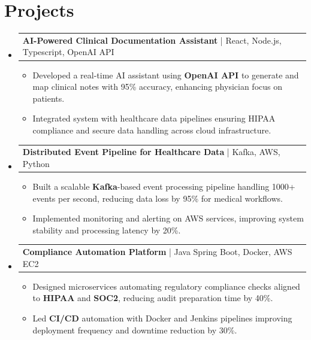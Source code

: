 \documentclass[letterpaper,11pt]{article}
\makeatletter
\newcommand{\resumeItem}[1]{
  \item\footnotesize{
    {#1 \vspace{-2pt}}
  }
}
\newcommand{\resumeProjectHeading}[2]{
    \item
    \begin{tabular*}{1.001\textwidth}{l@{\extracolsep{\fill}}r}
      \small#1 & \textbf{\small #2}\\
    \end{tabular*}\vspace{-7pt}
}
\newcommand{\resumeSubHeadingListStart}{\begin{itemize}[leftmargin=0pt, label={}]}
\newcommand{\resumeSubHeadingListEnd}{\end{itemize}}
\newcommand{\resumeItemListStart}{\begin{itemize}[leftmargin=*]}
\newcommand{\resumeItemListEnd}{\end{itemize}\vspace{-5pt}}
\makeatother
\begin{document}
\section{Projects}
    \vspace{-5pt}
    \resumeSubHeadingListStart
          \resumeProjectHeading
              {\textbf{AI-Powered Clinical Documentation Assistant} | React, Node.js, Typescript, OpenAI API}{}
        \resumeItemListStart
            \resumeItem{Developed a real-time AI assistant using \textbf{OpenAI API} to generate and map clinical notes with 95\% accuracy, enhancing physician focus on patients.}
            \resumeItem{Integrated system with healthcare data pipelines ensuring HIPAA compliance and secure data handling across cloud infrastructure.}
        \resumeItemListEnd
        \vspace{-12pt}
    
    \resumeProjectHeading
        {\textbf{Distributed Event Pipeline for Healthcare Data} | Kafka, AWS, Python}{}
        \resumeItemListStart
            \resumeItem{Built a scalable \textbf{Kafka}-based event processing pipeline handling 1000+ events per second, reducing data loss by 95\% for medical workflows.}
            \resumeItem{Implemented monitoring and alerting on AWS services, improving system stability and processing latency by 20\%.}
        \resumeItemListEnd
          \vspace{-12pt}
      \resumeProjectHeading
          {\textbf{Compliance Automation Platform} | Java Spring Boot, Docker, AWS EC2}{}
          \resumeItemListStart
              \resumeItem{Designed microservices automating regulatory compliance checks aligned to \textbf{HIPAA} and \textbf{SOC2}, reducing audit preparation time by 40\%.}
              \resumeItem{Led \textbf{CI/CD} automation with Docker and Jenkins pipelines improving deployment frequency and downtime reduction by 30\%.}
          \resumeItemListEnd 
    \resumeSubHeadingListEnd
\end{document}
